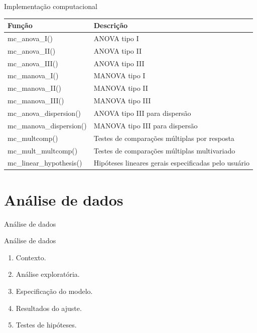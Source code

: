 \documentclass[
  ignorenonframetext,
  serif,
  professionalfont,
  usenames,
  dvipsnames,
  aspectratio = 169]{beamer}
\begin{document}
\begin{frame}{Implementação computacional}
\protect\hypertarget{implementauxe7uxe3o-computacional-2}{}
\begin{table}[h]
\centering
\begin{tabular}{ll}
\hline
Função                   & Descrição \\ 
\hline

mc\_anova\_I()           & ANOVA  tipo I \\
mc\_anova\_II()          & ANOVA  tipo II \\
mc\_anova\_III()         & ANOVA  tipo III \\

mc\_manova\_I()          & MANOVA tipo I \\
mc\_manova\_II()         & MANOVA tipo II \\
mc\_manova\_III()        & MANOVA tipo III \\

mc\_anova\_dispersion()        & ANOVA  tipo III para dispersão \\
mc\_manova\_dispersion()       & MANOVA tipo III para dispersão \\

mc\_multcomp()           & Testes de comparações múltiplas por resposta \\

mc\_mult\_multcomp()     & Testes de comparações múltiplas multivariado \\

mc\_linear\_hypothesis() & Hipóteses lineares gerais especificadas pelo usuário \\

\hline
\end{tabular}
\label{tab:funcoes}
\end{table}
\end{frame}

\hypertarget{anuxe1lise-de-dados}{%
\section{Análise de dados}\label{anuxe1lise-de-dados}}

\begin{frame}{Análise de dados}
\end{frame}

\begin{frame}{Análise de dados}
\protect\hypertarget{anuxe1lise-de-dados-1}{}
\begin{enumerate}
    \itemsep 2ex
  
  \item Contexto.
    
  \item Análise exploratória.
  
  \item Especificação do modelo.
  
  \item Resultados do ajuste.
  
  \item Testes de hipóteses.
 
\end{enumerate}
\end{frame}
\end{document}
